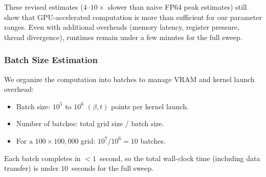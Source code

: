 These revised estimates ($4$--$10\times$ slower than naive FP64 peak estimates) still show
that GPU-accelerated computation is more than sufficient for our parameter ranges. Even
with additional overheads (memory latency, register pressure, thread divergence), runtimes
remain under a few minutes for the full sweep.

\subsubsection{Batch Size Estimation}
\label{sec:batch}

We organize the computation into batches to manage VRAM and kernel launch overhead:
\begin{itemize}
  \item Batch size: $10^5$ to $10^6$ $(\beta, t)$ points per kernel launch.
  \item Number of batches: total grid size / batch size.
  \item For a $100 \times 100{,}000$ grid: $10^7 / 10^6 = 10$ batches.
\end{itemize}
Each batch completes in $< 1$~second, so the total wall-clock time (including data
transfer) is under $10$~seconds for the full sweep.
